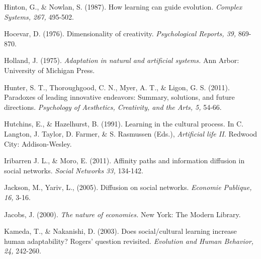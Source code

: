 \documentclass[a4paper,12pt,man,british]{apa6}
\begin{document}
\begin{description}

\item Hinton, G., \& Nowlan, S. (1987). How learning can guide evolution. \emph{Complex Systems, 267,} 495-502.

\item Hocevar, D. (1976). Dimensionality of creativity. \emph{Psychological Reports, 39,} 869-870.

\item Holland, J. (1975). {\it Adaptation in natural and artificial systems.} Ann Arbor: University of Michigan Press.

\item Hunter, S. T., Thoroughgood, C. N., Myer, A. T., \& Ligon, G. S. (2011). Paradoxes of leading innovative endeavors: Summary, solutions, and future directions. {\it Psychology of Aesthetics, Creativity, and the Arts, 5,} 54-66.

\item Hutchins, E., \& Hazelhurst, B. (1991). Learning in the cultural process. In C. Langton, J. Taylor, D. Farmer, \& S. Rasmussen (Eds.), \emph{Artificial life II.} Redwood City: Addison-Wesley.

\item Iribarren J. L., \& Moro, E. (2011). Affinity paths and information diffusion in social networks. \emph{Social Networks 33,} 134-142. 

\item Jackson, M., Yariv, L., (2005). Diffusion on social networks. \emph{Economie Publique, 16,} 3-16.

\item Jacobs, J. (2000). \emph{The nature of economies.} New York: The Modern Library. 


\item Kameda, T., \& Nakanishi, D. (2003). Does social/cultural learning increase human adaptability? Rogers' question revisited. \emph{Evolution and Human Behavior, 24,} 242-260.



\end{description}
\end{document}
